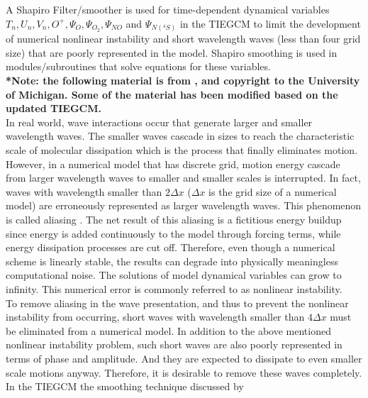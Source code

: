 %
\section{}\label{cap:shapiro}
%
A Shapiro Filter/smoother is used for  
time-dependent dynamical variables $T_n, U_n, V_n, O^+, \Psi_O, \Psi_{O_2},
\Psi_{NO}$  and  $\Psi_{N(^4S)}$
in the TIEGCM to limit the development of numerical 
nonlinear instability and short wavelength waves 
(less than four grid size) that are poorly represented 
in the model. Shapiro smoothing is used in 
modules/subroutines that solve equations for 
these variables. \\
%
\textbf{*Note: the following material is from \cite{wang1998}, 
and copyright to the University of Michigan. Some of 
the material has been modified based on the updated TIEGCM. } \\
%
In real world, wave interactions occur that generate 
larger and smaller wavelength waves. The smaller waves 
cascade in sizes to reach the characteristic scale of 
molecular dissipation which is the process that finally 
eliminates motion. However, in a numerical model that has 
discrete grid, motion energy cascade from larger wavelength 
waves to smaller and smaller scales is interrupted. In fact, 
waves with wavelength smaller than $2 \Delta x$ ($\Delta x$ is the grid size 
of a numerical model) are erroneously represented as larger 
wavelength waves. This phenomenon is called aliasing 
\cite{pielke1984}. The net result of this aliasing is a 
fictitious energy buildup since energy is added 
continuously to the model through forcing terms, 
while energy dissipation processes are cut off. 
Therefore, even though a numerical scheme is 
linearly stable, the results can degrade into physically 
meaningless computational noise. The solutions of model 
dynamical variables can grow to infinity. This numerical 
error is commonly referred to as nonlinear instability. \\
%
To remove aliasing in the wave presentation, and thus to 
prevent the nonlinear instability from occurring, short 
waves with wavelength smaller than $4 \Delta x$ must be eliminated 
from a numerical model. In addition to the above mentioned 
nonlinear instability problem, such short waves are also 
poorly represented in terms of phase and amplitude. And they 
are expected to dissipate to even smaller scale motions anyway. 
Therefore, it is desirable to remove these waves completely.\\
%
In the TIEGCM the smoothing technique discussed by \cite{shapiro1970} 
